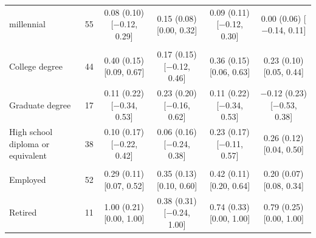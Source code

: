 \begin{table}[t]
\begin{tabular}{@{}lr*{4}{c}@{}}
\quad millennial & 55 & \makecell{0.08 (0.10)\\ {[}$-$0.12, 0.29{]}} & \makecell{0.15 (0.08)\\ {[}0.00, 0.32{]}} & \makecell{0.09 (0.11)\\ {[}$-$0.12, 0.30{]}} & \makecell{0.00 (0.06)\\ {[}$-$0.14, 0.11{]}} \\
\addlinespace
\multicolumn{6}{@{}l}{\textit{Education (N)}} \\
\quad College degree & 44 & \makecell{0.40 (0.15)\\ {[}0.09, 0.67{]}} & \makecell{0.17 (0.15)\\ {[}$-$0.12, 0.46{]}} & \makecell{0.36 (0.15)\\ {[}0.06, 0.63{]}} & \makecell{0.23 (0.10)\\ {[}0.05, 0.44{]}} \\
\quad Graduate degree & 17 & \makecell{0.11 (0.22)\\ {[}$-$0.34, 0.53{]}} & \makecell{0.23 (0.20)\\ {[}$-$0.16, 0.62{]}} & \makecell{0.11 (0.22)\\ {[}$-$0.34, 0.53{]}} & \makecell{$-$0.12 (0.23)\\ {[}$-$0.53, 0.38{]}} \\
\quad High school diploma or equivalent & 38 & \makecell{0.10 (0.17)\\ {[}$-$0.22, 0.42{]}} & \makecell{0.06 (0.16)\\ {[}$-$0.24, 0.38{]}} & \makecell{0.23 (0.17)\\ {[}$-$0.11, 0.57{]}} & \makecell{0.26 (0.12)\\ {[}0.04, 0.50{]}} \\
\addlinespace
\multicolumn{6}{@{}l}{\textit{Occupation (N)}} \\
\quad Employed & 52 & \makecell{0.29 (0.11)\\ {[}0.07, 0.52{]}} & \makecell{0.35 (0.13)\\ {[}0.10, 0.60{]}} & \makecell{0.42 (0.11)\\ {[}0.20, 0.64{]}} & \makecell{0.20 (0.07)\\ {[}0.08, 0.34{]}} \\
\quad Retired & 11 & \makecell{1.00 (0.21)\\ {[}0.00, 1.00{]}} & \makecell{0.38 (0.31)\\ {[}$-$0.24, 1.00{]}} & \makecell{0.74 (0.33)\\ {[}0.00, 1.00{]}} & \makecell{0.79 (0.25)\\ {[}0.00, 1.00{]}} \\

\end{tabular}
\end{table}

